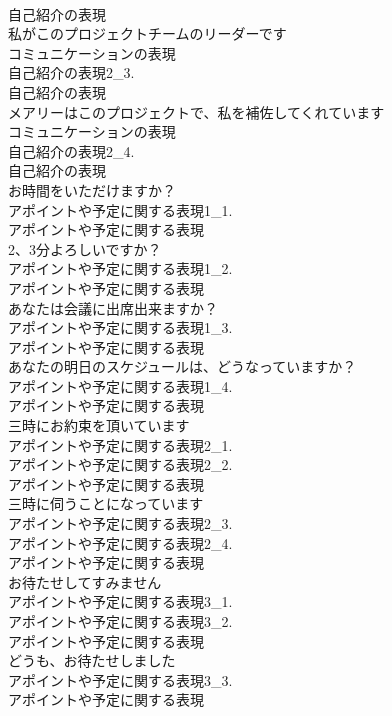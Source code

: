 \documentclass[8pt]{extreport}
\begin{document}
\begin{CJK}{UTF8}{min}
\\	自己紹介の表現
\\	私がこのプロジェクトチームのリーダーです	
\\	コミュニケーションの表現
\\	自己紹介の表現2_3.
\\	自己紹介の表現
\\	メアリーはこのプロジェクトで、私を補佐してくれています	
\\	コミュニケーションの表現
\\	自己紹介の表現2_4.
\\	自己紹介の表現
\\	お時間をいただけますか？	
\\	アポイントや予定に関する表現1_1.
\\	アポイントや予定に関する表現
\\	2、3分よろしいですか？	
\\	アポイントや予定に関する表現1_2.
\\	アポイントや予定に関する表現
\\	あなたは会議に出席出来ますか？	
\\	アポイントや予定に関する表現1_3.
\\	アポイントや予定に関する表現
\\	あなたの明日のスケジュールは、どうなっていますか？	
\\	アポイントや予定に関する表現1_4.
\\	アポイントや予定に関する表現
\\	三時にお約束を頂いています	
\\	アポイントや予定に関する表現2_1.
\\	アポイントや予定に関する表現2_2.
\\	アポイントや予定に関する表現
\\	三時に伺うことになっています	
\\	アポイントや予定に関する表現2_3.
\\	アポイントや予定に関する表現2_4.
\\	アポイントや予定に関する表現
\\	お待たせしてすみません	
\\	アポイントや予定に関する表現3_1.
\\	アポイントや予定に関する表現3_2.
\\	アポイントや予定に関する表現
\\	どうも、お待たせしました	
\\	アポイントや予定に関する表現3_3.
\\	アポイントや予定に関する表現

\end{CJK}
\end{document}
